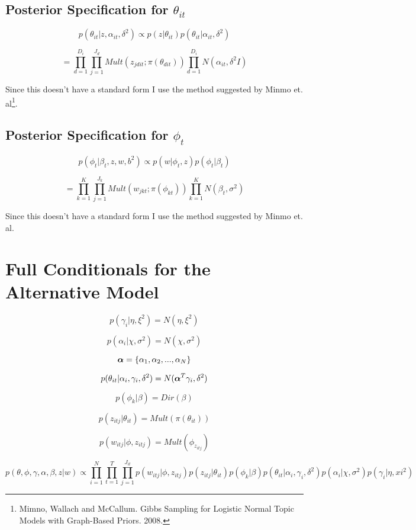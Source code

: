 \documentclass[a4paper]{article}
\begin{document}
\subsection{Posterior Specification for $\theta_{it}$}

\[p(\theta_{it} | z, \alpha_{it}, \delta^2) \propto p(z | \theta_{it}) p(\theta_{it} | \alpha_{it}, \delta^2)\]

\[= \prod_{d=1}^{D_i} \prod_{j=1}^{J_d} Mult(z_{jdit}; \pi(\theta_{dit}))\prod_{d=1}^{D_i} N(\alpha_{it}, \delta^2I)\]

Since this doesn't have a standard form I use the method suggested by Minmo et. al\footnote{Mimno, Wallach and McCallum. Gibbs Sampling for Logistic Normal Topic Models with Graph-Based Priors. 2008.}.

\subsection{Posterior Specification for $\phi_t$}

\[p(\phi_t | \beta_t, z, w, b^2) \propto p(w | \phi_t, z) p(\phi_t | \beta_t)\]

\[= \prod_{k=1}^K \prod_{j=1}^{J_k} Mult(w_{jkt}; \pi(\phi_{kt}))\prod_{k=1}^K N(\beta_t, \sigma^2)\]

Since this doesn't have a standard form I use the method suggested by Minmo et. al.

\section{Full Conditionals for the Alternative Model}

\[p(\gamma_i | \eta, \xi^2) = N(\eta, \xi^2)\]

\[p(\alpha_i|\chi,\sigma^2) = N(\chi, \sigma^2)\]

\[\text{\boldmath$\alpha$} = \{\alpha_1, \alpha_2, ...,\alpha_N\}\]

\[p(\theta_{it}| \alpha_i, \gamma_i,\delta^2) = N(\text{\boldmath$\alpha$}^T \gamma_i, \delta^2)\]

\[p(\phi_k | \beta) = Dir(\beta)\]

\[p(z_{itj}| \theta_{it}) = Mult(\pi(\theta_{it}))\]

\[p(w_{itj} | \phi, z_{itj}) = Mult(\phi_{z_{itj}})\]

\[p(\theta, \phi, \gamma, \alpha, \beta, z | w) \propto \prod_{i=1}^N \prod_{t=1}^T \prod_{j=1}^{J_{it}} p(w_{itj} | \phi, z_{itj}) p(z_{itj} | \theta_{it}) p(\phi_k | \beta) p(\theta_{it} | \alpha_i, \gamma_i, \delta^2) p(\alpha_i | \chi, \sigma^2) p(\gamma_i | \eta, xi^2)\]
\end{document}

